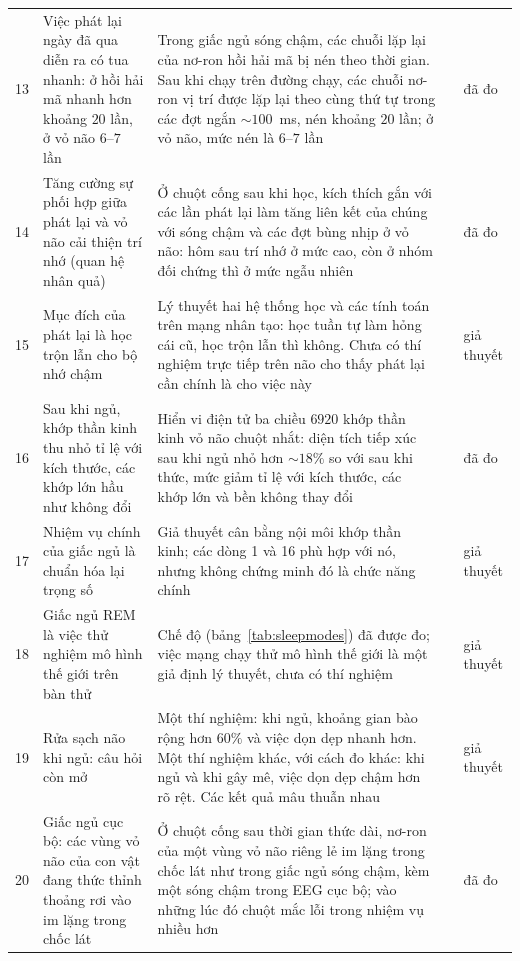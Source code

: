 {\begin{longtable}{>{\raggedright}p{0.5cm}>{\raggedright}p{4.0cm}>{\raggedright}p{5.6cm}>{\raggedright}p{2.3cm}>{\raggedright\arraybackslash}p{1.7cm}}
13 & Việc phát lại ngày đã qua diễn ra có tua nhanh: ở hồi hải mã nhanh hơn khoảng $20$ lần, ở vỏ não $6$--$7$ lần & Trong giấc ngủ sóng chậm, các chuỗi lặp lại của nơ-ron hồi hải mã bị nén theo thời gian. Sau khi chạy trên đường chạy, các chuỗi nơ-ron vị trí được lặp lại theo cùng thứ tự trong các đợt ngắn $\sim100$~ms, nén khoảng $20$ lần; ở vỏ não, mức nén là $6$--$7$ lần & \cite{Nadasdy1999,LeeWilson2002,Euston2007} & đã đo \\
14 & Tăng cường sự phối hợp giữa phát lại và vỏ não cải thiện trí nhớ (quan hệ nhân quả) & Ở chuột cống sau khi học, kích thích gắn với các lần phát lại làm tăng liên kết của chúng với sóng chậm và các đợt bùng nhịp ở vỏ não: hôm sau trí nhớ ở mức cao, còn ở nhóm đối chứng thì ở mức ngẫu nhiên & \cite{Maingret2016} & đã đo \\
15 & Mục đích của phát lại là học trộn lẫn cho bộ nhớ chậm & Lý thuyết hai hệ thống học và các tính toán trên mạng nhân tạo: học tuần tự làm hỏng cái cũ, học trộn lẫn thì không. Chưa có thí nghiệm trực tiếp trên não cho thấy phát lại cần chính là cho việc này & \cite{McClelland1995} & giả thuyết \\
16 & Sau khi ngủ, khớp thần kinh thu nhỏ tỉ lệ với kích thước, các khớp lớn hầu như không đổi & Hiển vi điện tử ba chiều $6920$ khớp thần kinh vỏ não chuột nhắt: diện tích tiếp xúc sau khi ngủ nhỏ hơn $\sim18\%$ so với sau khi thức, mức giảm tỉ lệ với kích thước, các khớp lớn và bền không thay đổi & \cite{deVivo2017} & đã đo \\
17 & Nhiệm vụ chính của giấc ngủ là chuẩn hóa lại trọng số & Giả thuyết cân bằng nội môi khớp thần kinh; các dòng 1 và 16 phù hợp với nó, nhưng không chứng minh đó là chức năng chính & \cite{TononiCirelli2014} & giả thuyết \\
18 & Giấc ngủ REM là việc thử nghiệm mô hình thế giới trên bàn thử & Chế độ (bảng~\ref{tab:sleepmodes}) đã được đo; việc mạng chạy thử mô hình thế giới là một giả định lý thuyết, chưa có thí nghiệm & \cite{Hobson2009} & giả thuyết \\
19 & Rửa sạch não khi ngủ: câu hỏi còn mở & Một thí nghiệm: khi ngủ, khoảng gian bào rộng hơn $60\%$ và việc dọn dẹp nhanh hơn. Một thí nghiệm khác, với cách đo khác: khi ngủ và khi gây mê, việc dọn dẹp chậm hơn rõ rệt. Các kết quả mâu thuẫn nhau & \cite{Xie2013,Miao2024} & giả thuyết \\
20 & Giấc ngủ cục bộ: các vùng vỏ não của con vật đang thức thỉnh thoảng rơi vào im lặng trong chốc lát & Ở chuột cống sau thời gian thức dài, nơ-ron của một vùng vỏ não riêng lẻ im lặng trong chốc lát như trong giấc ngủ sóng chậm, kèm một sóng chậm trong EEG cục bộ; vào những lúc đó chuột mắc lỗi trong nhiệm vụ nhiều hơn & \cite{Vyazovskiy2011} & đã đo \\
\bottomrule
\end{longtable}}
